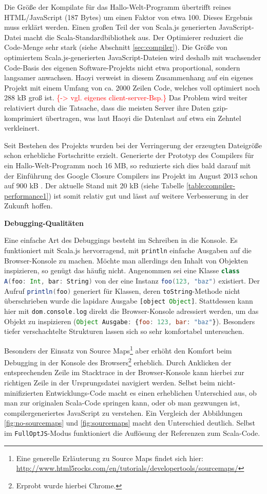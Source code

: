 \documentclass[a4paper, 12pt, hidelinks, listof=totoc, listoftables=totoc, bibliography=totoc]{scrreprt}
\newcommand{\code}[1]{\lstinline[language=Scala, style=inline]|#1|}
\newcommand{\scala}[1]{\lstinline[language=Scala, style=inline]|#1|}
\newcommand{\js}[1]{\lstinline[language=JavaScript, style=inline]|#1|}
\newcommand{\TODOi}[1]{\textcolor{red}{\{#1\}}}
\newcommand{\MyMiniSec}[1]{\rmfamily\fontsize{12}{15}\selectfont
	\vspace{7pt}\textbf{#1} %
}
\begin{document}
Die Größe der Kompilate für das Hallo-Welt-Programm übertrifft reines \ac{HTML}/JavaScript (187 Bytes) um einen Faktor von etwa 100. Dieses Ergebnis muss erklärt werden. Einen großen Teil der von Scala.js generierten JavaScript-Datei macht die Scala-Standardbibliothek aus. Der Optimierer reduziert die Code-Menge sehr stark (siehe Abschnitt \ref{sec:compiler}). Die Größe von optimiertem Scala.js-generierten JavaScript-Dateien wird deshalb mit wachsender Code-Basis des eigenen Software-Projekts nicht etwa proportional, sondern langsamer anwachsen. Haoyi verweist in diesem Zusammenhang auf ein eigenes Projekt mit einem Umfang von ca. 2000 Zeilen Code, welches voll optimiert noch 288 kB groß ist. \TODOi{-> vgl. eigenes client-server-Bsp.} Das Problem wird weiter relativiert durch die Tatsache, dass die meisten Server ihre Daten gzip-komprimiert übertragen, was laut Haoyi die Datenlast auf etwa ein Zehntel verkleinert. \cite[\#BlobSize]{haoyi.HOS}

Seit Bestehen des Projekts wurden bei der Verringerung der erzeugten Dateigröße schon erhebliche Fortschritte erzielt. Generierte der Prototyp des Compilers für ein Hallo-Welt-Programm noch 16 MB, so reduzierte sich dies bald darauf mit der Einführung des Google Closure Compilers ins Projekt im August 2013 schon auf 900 kB \cite[Folie~5~f., Min.~6]{doeraene2014.WHB}. Der aktuelle Stand mit 20 kB (siehe Tabelle \ref{table:compiler-performance1}) ist somit relativ gut und lässt auf weitere Verbesserung in der Zukunft hoffen.


\MyMiniSec{Debugging-Qualitäten}

Eine einfache Art des Debuggings besteht im Schreiben in die Konsole. Es funktioniert mit Scala.js hervorragend, mit \scala{println} einfache Ausgaben auf die Browser-Konsole zu machen. Möchte man allerdings den Inhalt von Objekten inspizieren, so genügt das häufig nicht. Angenommen sei eine Klasse \scala{class A(foo: Int, bar: String)} von der eine Instanz \scala{foo(123, "baz")} existiert. Der Aufruf \scala{println(foo)} generiert für Klassen, deren \scala{toString}-Methode nicht überschrieben wurde die lapidare Ausgabe \js{[object Object]}. Stattdessen kann hier mit \scala{dom.console.log} direkt die Browser-Konsole adressiert werden, um das Objekt zu inspizieren (\js{Object Ausgabe: {foo: 123, bar: "baz"}}). Besonders tiefer verschachtelte Strukturen lassen sich so sehr komfortabel untersuchen.

Besonders der Einsatz von Source Maps\footnote{Eine generelle Erläuterung zu Source Maps findet sich hier: \url{http://www.html5rocks.com/en/tutorials/developertools/sourcemaps/}} aber erhöht den Komfort beim Debugging in der Konsole des Browsers\footnote{Erprobt wurde hierbei Chrome.} erheblich. Durch Anklicken der entsprechenden Zeile im Stacktrace in der Browser-Konsole kann hierbei zur richtigen Zeile in der Ursprungsdatei navigiert werden. Selbst beim nicht-minifizierten Entwicklungs-Code macht es einen erheblichen Unterschied aus, ob man zur originalen Scala-Code springen kann, oder ob man gezwungen ist, compilergeneriertes JavaScript zu verstehen. Ein Vergleich der Abbildungen \ref{fig:no-sourcemaps} und \ref{fig:sourcemaps} macht den Unterschied deutlich. Selbst im \code{FullOptJS}-Modus funktioniert die Auflösung der Referenzen zum Scala-Code.
\end{document}
